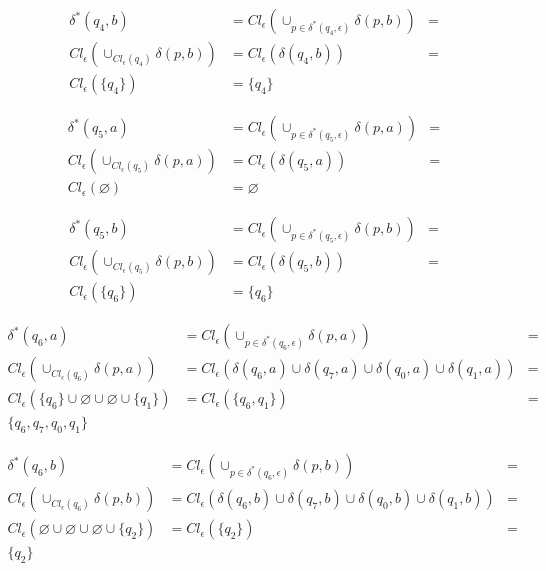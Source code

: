 \documentclass{article}
\begin{document}
\begin{enumerate}
{\begin{enumerate}
{					\begin{align*}
					\delta^{*} (q_{4},b)&=
					Cl_{\epsilon} (\cup_{p \in \delta^{*} (q_{4}, \epsilon)}	\delta (p,b)) &=\\
					Cl_{\epsilon} (\cup_{Cl_{\epsilon} (q_{4})}	\delta (p,b)) &=
					Cl_{\epsilon} ( \delta(q_{4},b)) &=\\
					Cl_{\epsilon} (\{q_{4}\}) &=
					\{q_{4}\}
					\end{align*}
					
					\begin{align*}
					\delta^{*} (q_{5},a)&=
					Cl_{\epsilon} (\cup_{p \in \delta^{*} (q_{5}, \epsilon)}	\delta (p,a)) &=\\
					Cl_{\epsilon} (\cup_{Cl_{\epsilon} (q_{5})}	\delta (p,a)) &=
					Cl_{\epsilon} ( \delta(q_{5},a)) &=\\
					Cl_{\epsilon} (\varnothing) &=
					\varnothing
					\end{align*}
					
					\begin{align*}
					\delta^{*} (q_{5},b)&=
					Cl_{\epsilon} (\cup_{p \in \delta^{*} (q_{5}, \epsilon)}	\delta (p,b)) &=\\
					Cl_{\epsilon} (\cup_{Cl_{\epsilon} (q_{5})}	\delta (p,b)) &=
					Cl_{\epsilon} ( \delta(q_{5},b)) &=\\
					Cl_{\epsilon} (\{q_{6}\}) &=
					\{q_{6}\}
					\end{align*}
					
					\begin{align*}
					\delta^{*} (q_{6},a)&=
					Cl_{\epsilon} (\cup_{p \in \delta^{*} (q_{6}, \epsilon)}	\delta (p,a)) &=\\
					Cl_{\epsilon} (\cup_{Cl_{\epsilon} (q_{6})}	\delta (p,a)) &=
					Cl_{\epsilon} ( \delta(q_{6},a) \cup \delta(q_{7},a) \cup \delta(q_{0},a) \cup \delta(q_{1},a)) &=\\
					Cl_{\epsilon} ( \{q_{6}\} \cup \varnothing \cup \varnothing \cup \{q_{1}\}) &=
					Cl_{\epsilon} (\{q_{6}, q_{1}\}) &=\\
					\{q_{6}, q_{7}, q_{0}, q_{1}\}
					\end{align*}
					
					\begin{align*}
					\delta^{*} (q_{6},b)&=
					Cl_{\epsilon} (\cup_{p \in \delta^{*} (q_{6}, \epsilon)}	\delta (p,b)) &=\\
					Cl_{\epsilon} (\cup_{Cl_{\epsilon} (q_{6})}	\delta (p,b)) &=
					Cl_{\epsilon} ( \delta(q_{6},b) \cup \delta(q_{7},b) \cup \delta(q_{0},b) \cup \delta(q_{1},b)) &=\\
					Cl_{\epsilon} ( \varnothing \cup \varnothing \cup \varnothing \cup \{q_{2}\}) &=
					Cl_{\epsilon} (\{q_{2}\}) &=\\
					\{q_{2}\}
					\end{align*}
					
}
\end{enumerate}}
\end{enumerate}
\end{document}

